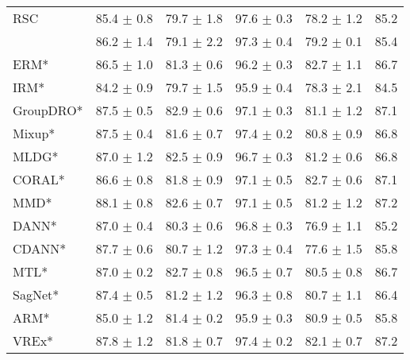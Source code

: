 \begin{table*}
\begin{center}
\begin{tabular}{lccccc}
RSC                  & 85.4 $\pm$ 0.8       & 79.7 $\pm$ 1.8       & 97.6 $\pm$ 0.3       & 78.2 $\pm$ 1.2       & 85.2                 \\
\divcams 	        & 86.2 $\pm$ 1.4       & 79.1 $\pm$ 2.2        & 97.3 $\pm$ 0.4       & 79.2 $\pm$ 0.1       & 85.4                \\
\midrule
ERM*                  & 86.5 $\pm$ 1.0       & 81.3 $\pm$ 0.6       & 96.2 $\pm$ 0.3       & 82.7 $\pm$ 1.1       & 86.7                 \\
IRM*                  & 84.2 $\pm$ 0.9       & 79.7 $\pm$ 1.5       & 95.9 $\pm$ 0.4       & 78.3 $\pm$ 2.1       & 84.5                 \\
GroupDRO*             & 87.5 $\pm$ 0.5       & 82.9 $\pm$ 0.6       & 97.1 $\pm$ 0.3       & 81.1 $\pm$ 1.2       & 87.1                 \\
Mixup*                & 87.5 $\pm$ 0.4       & 81.6 $\pm$ 0.7       & 97.4 $\pm$ 0.2       & 80.8 $\pm$ 0.9       & 86.8                 \\
MLDG*                 & 87.0 $\pm$ 1.2       & 82.5 $\pm$ 0.9       & 96.7 $\pm$ 0.3       & 81.2 $\pm$ 0.6       & 86.8                 \\
CORAL*                & 86.6 $\pm$ 0.8       & 81.8 $\pm$ 0.9       & 97.1 $\pm$ 0.5       & 82.7 $\pm$ 0.6       & 87.1                 \\
MMD*                  & 88.1 $\pm$ 0.8       & 82.6 $\pm$ 0.7       & 97.1 $\pm$ 0.5       & 81.2 $\pm$ 1.2       & 87.2                 \\
DANN*                 & 87.0 $\pm$ 0.4       & 80.3 $\pm$ 0.6       & 96.8 $\pm$ 0.3       & 76.9 $\pm$ 1.1       & 85.2                 \\
CDANN*                & 87.7 $\pm$ 0.6       & 80.7 $\pm$ 1.2       & 97.3 $\pm$ 0.4       & 77.6 $\pm$ 1.5       & 85.8                 \\
MTL*                  & 87.0 $\pm$ 0.2       & 82.7 $\pm$ 0.8       & 96.5 $\pm$ 0.7       & 80.5 $\pm$ 0.8       & 86.7                 \\
SagNet*               & 87.4 $\pm$ 0.5       & 81.2 $\pm$ 1.2       & 96.3 $\pm$ 0.8       & 80.7 $\pm$ 1.1       & 86.4                 \\
ARM*                  & 85.0 $\pm$ 1.2       & 81.4 $\pm$ 0.2       & 95.9 $\pm$ 0.3       & 80.9 $\pm$ 0.5       & 85.8                 \\
VREx*                 & 87.8 $\pm$ 1.2       & 81.8 $\pm$ 0.7       & 97.4 $\pm$ 0.2       & 82.1 $\pm$ 0.7       & 87.2                 \\

\end{tabular}
\end{center}
\end{table*}
